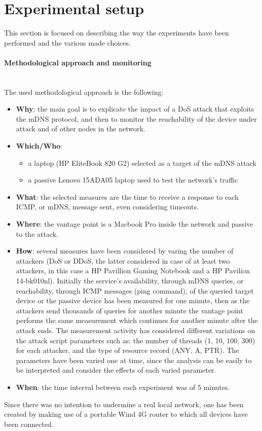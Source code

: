 \documentclass[fleqn, 11pt]{SelfArx} %
\begin{document}
\section{Experimental setup}
This section is focused on describing the way the experiments have been performed and the various made choices.

\paragraph{Methodological approach and monitoring}\mbox{}\\
The used methodological approach is the following:
\begin{itemize}[leftmargin=*]
	\item \textbf{Why}: the main goal is to explicate the impact of a DoS attack that exploits the mDNS protocol, and then to monitor the reachability of the device under attack and of other nodes in the network.
	\item \textbf{Which/Who}:
\begin{itemize}[leftmargin=*, noitemsep, topsep=0pt]
    \item a laptop (HP EliteBook 820 G2) selected as a target of the mDNS attack
    \item a passive Lenovo 15ADA05 laptop used to test the network's traffic
\end{itemize}
	\item \textbf{What}: the selected measures are the time to receive a response to each ICMP, or mDNS, message sent, even considering timeouts.
	\item \textbf{Where}: the vantage point is a Macbook Pro inside the network and passive to the attack.
	\item \textbf{How}: several measures have been considered by varing the number of attackers (DoS or DDoS, the latter considered in case of at least two attackers, in this case a HP Pavillion Gaming Notebook and a HP Pavilion 14-bk010nl). Initially the service's availability, through mDNS queries, or reachability, through ICMP messages (ping command), of the queried target device or the passive device has been measured for one minute, then as the attackers send thousands of queries for another minute the vantage point performs the same measurement which continues for another minute after the attack ends. \newline
The measurement activity has considered different variations on the attack script parameters such as: the number of threads (1, 10, 100, 300) for each attacker, and the type of resource record (ANY, A, PTR). The parameters have been varied one at time, since the analysis can be easily to be interpreted and consider the effects of each varied parameter.
\item \textbf{When}: the time interval between each experiment was of 5 minutes.
\end{itemize}
Since there was no intention to undermine a real local network, one has been created by making use of a portable Wind 4G router \cite{RouterSpecs} to which all devices have been connected.
\end{document}

